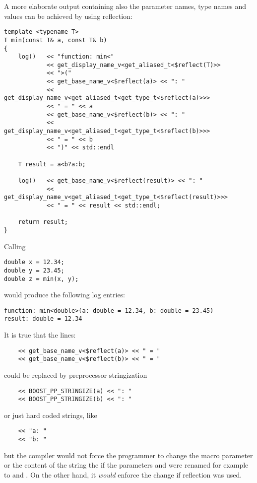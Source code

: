 A more elaborate output containing also the parameter names, type names and values
can be achieved by using reflection:

\begin{verbatim}
template <typename T>
T min(const T& a, const T& b)
{
	log()   << "function: min<"
	        << get_display_name_v<get_aliased_t<$reflect(T)>>
	        << ">("
	        << get_base_name_v<$reflect(a)> << ": "
	        << get_display_name_v<get_aliased_t<get_type_t<$reflect(a)>>>
	        << " = " << a
	        << get_base_name_v<$reflect(b)> << ": "
	        << get_display_name_v<get_aliased_t<get_type_t<$reflect(b)>>>
	        << " = " << b
	        << ")" << std::endl

	T result = a<b?a:b;

	log()   << get_base_name_v<$reflect(result)> << ": "
	        << get_display_name_v<get_aliased_t<get_type_t<$reflect(result)>>>
	        << " = " << result << std::endl;

	return result;
}
\end{verbatim}

Calling

\begin{verbatim}
double x = 12.34;
double y = 23.45;
double z = min(x, y);
\end{verbatim}

would produce the following log entries:

\begin{verbatim}
function: min<double>(a: double = 12.34, b: double = 23.45)
result: double = 12.34
\end{verbatim}


It is true that the lines:
\begin{verbatim}
	<< get_base_name_v<$reflect(a)> << " = "
	<< get_base_name_v<$reflect(b)> << " = "
\end{verbatim}

could be replaced by preprocessor stringization

\begin{verbatim}
	<< BOOST_PP_STRINGIZE(a) << ": "
	<< BOOST_PP_STRINGIZE(b) << ": "
\end{verbatim}

or just hard coded strings, like

\begin{verbatim}
	<< "a: "
	<< "b: "
\end{verbatim}

but the compiler would not force the programmer to change the macro parameter
or the content of the string the if the parameters \verb@a@ and \verb@b@ were renamed
for example to \verb@first@ and \verb@second@. On the other hand, it {\em would}
enforce the change if reflection was used.

